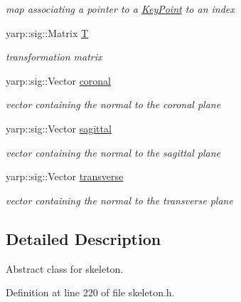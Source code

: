 \begin{DoxyCompactItemize}
\begin{DoxyCompactList}\small\item\em map associating a pointer to a \mbox{\hyperlink{classassistive__rehab_1_1KeyPoint}{Key\+Point}} to an index \end{DoxyCompactList}\item 
\mbox{\label{classassistive__rehab_1_1Skeleton_a358a1c5eb23a562f8558ff8d43583ef7}} 
yarp\+::sig\+::\+Matrix \mbox{\hyperlink{classassistive__rehab_1_1Skeleton_a358a1c5eb23a562f8558ff8d43583ef7}{T}}
\begin{DoxyCompactList}\small\item\em transformation matrix \end{DoxyCompactList}\item 
\mbox{\label{classassistive__rehab_1_1Skeleton_ad042a7e60e6d72cc87b06c5fb0bdfae2}} 
yarp\+::sig\+::\+Vector \mbox{\hyperlink{classassistive__rehab_1_1Skeleton_ad042a7e60e6d72cc87b06c5fb0bdfae2}{coronal}}
\begin{DoxyCompactList}\small\item\em vector containing the normal to the coronal plane \end{DoxyCompactList}\item 
\mbox{\label{classassistive__rehab_1_1Skeleton_a72d6ccb619619e77a17258b08496a972}} 
yarp\+::sig\+::\+Vector \mbox{\hyperlink{classassistive__rehab_1_1Skeleton_a72d6ccb619619e77a17258b08496a972}{sagittal}}
\begin{DoxyCompactList}\small\item\em vector containing the normal to the sagittal plane \end{DoxyCompactList}\item 
\mbox{\label{classassistive__rehab_1_1Skeleton_ab8a9bf9297f520e8de801248e0b8d2dd}} 
yarp\+::sig\+::\+Vector \mbox{\hyperlink{classassistive__rehab_1_1Skeleton_ab8a9bf9297f520e8de801248e0b8d2dd}{transverse}}
\begin{DoxyCompactList}\small\item\em vector containing the normal to the transverse plane \end{DoxyCompactList}\end{DoxyCompactItemize}


\subsection{Detailed Description}
Abstract class for skeleton. 

Definition at line 220 of file skeleton.\+h.



